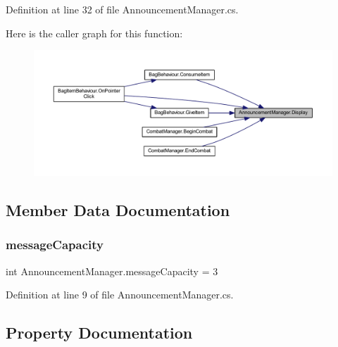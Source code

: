 Definition at line 32 of file Announcement\+Manager.\+cs.

Here is the caller graph for this function\+:
\nopagebreak
\begin{figure}[H]
\begin{center}
\leavevmode
\includegraphics[width=350pt]{class_announcement_manager_a931bdfbc829e1165fdbd7a3a848e95d1_icgraph}
\end{center}
\end{figure}


\subsection{Member Data Documentation}
\mbox{\label{class_announcement_manager_aa23d155cc088be3437ef92cc337c0492}} 
\subsubsection{\texorpdfstring{messageCapacity}{messageCapacity}}
{\footnotesize\ttfamily int Announcement\+Manager.\+message\+Capacity = 3\hspace{0.3cm}{\ttfamily [static]}}



Definition at line 9 of file Announcement\+Manager.\+cs.



\subsection{Property Documentation}
\mbox{\label{class_announcement_manager_a23f0a77f19174bf82815db8a2c3f4c94}} 
